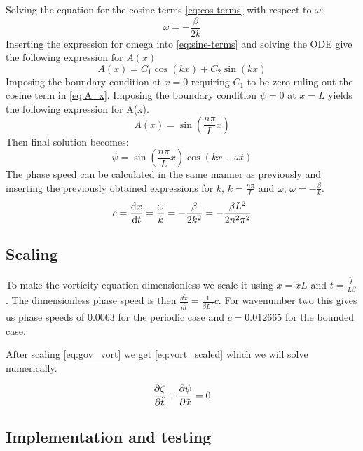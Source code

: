 Solving the equation for the cosine terms \cref{eq:cos-terms} with respect to
$\omega$:
\begin{equation}
    \omega = -\frac{\beta}{2k}
\end{equation}
Inserting the expression for omega into \cref{eq:sine-terms} and solving the ODE
give the following expression for $A(x)$
\begin{equation}\label{eq:A_x}
    A(x) = C_1 \cos{(kx) + C_2 \sin{(kx)}}
\end{equation}
Imposing the boundary condition at $x=0$ requiring $C_1$ to be zero ruling
out the cosine term in \cref{eq:A_x}. Imposing the boundary condition $\psi=0$
at $x=L$ yields the following expression for A(x).
\begin{equation}
    A(x) = \sin{\left(\frac{n\pi}{L} x \right)}
\end{equation}
Then final solution becomes:
\begin{equation}
    \psi = \sin{\left(\frac{n\pi}{L} x \right)} \cos{(kx - \omega t)}
\end{equation}
The phase speed can be calculated in the same manner as previously and inserting
the previously obtained expressions for $k$, $k=\frac{n\pi}{L}$ and $\omega$,
$\omega = -\frac{\beta}{k}$.
\begin{equation}
    c = \dv{x}{t} = \frac{\omega}{k} = -\frac{\beta}{2k^2} = -\frac{\beta L^2}{2 n^2 \pi^2}
\end{equation}

\subsection{Scaling}

To make the vorticity equation dimensionless we scale it using $x = \tilde{x} L $ and $t = \frac{\tilde{t}}{L \beta}$. The dimensionless phase speed is then $\frac{d\tilde{x}}{d\tilde{t}} = \frac{1}{\beta L^2} c$. For wavenumber two this gives us phase speeds of
$0.0063$ for the periodic case and $c = 0.012665$ for the bounded case.

After scaling \cref{eq:gov_vort} we get \cref{eq:vort_scaled} which we
will solve numerically.

\begin{equation}
  \pdv{\zeta}{\tilde{t}} + \pdv{\psi}{\tilde{x}} = 0
  \label{eq:vort_scaled}
\end{equation}


\subsection{Implementation and testing}

